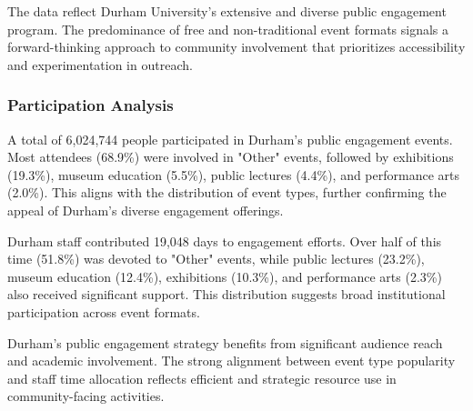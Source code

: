 \documentclass[journal,onecolumn, 10pt,draftclsnofoot]{IEEEtran}
\begin{document}
The data reflect Durham University's extensive and diverse public engagement program. The predominance of free and non-traditional event formats signals a forward-thinking approach to community involvement that prioritizes accessibility and experimentation in outreach.

\subsubsection{Participation Analysis}

A total of 6,024,744 people participated in Durham's public engagement events. Most attendees (68.9\%) were involved in "Other" events, followed by exhibitions (19.3\%), museum education (5.5\%), public lectures (4.4\%), and performance arts (2.0\%). This aligns with the distribution of event types, further confirming the appeal of Durham's diverse engagement offerings.

Durham staff contributed 19,048 days to engagement efforts. Over half of this time (51.8\%) was devoted to "Other" events, while public lectures (23.2\%), museum education (12.4\%), exhibitions (10.3\%), and performance arts (2.3\%) also received significant support. This distribution suggests broad institutional participation across event formats.



Durham's public engagement strategy benefits from significant audience reach and academic involvement. The strong alignment between event type popularity and staff time allocation reflects efficient and strategic resource use in community-facing activities.
\end{document}
